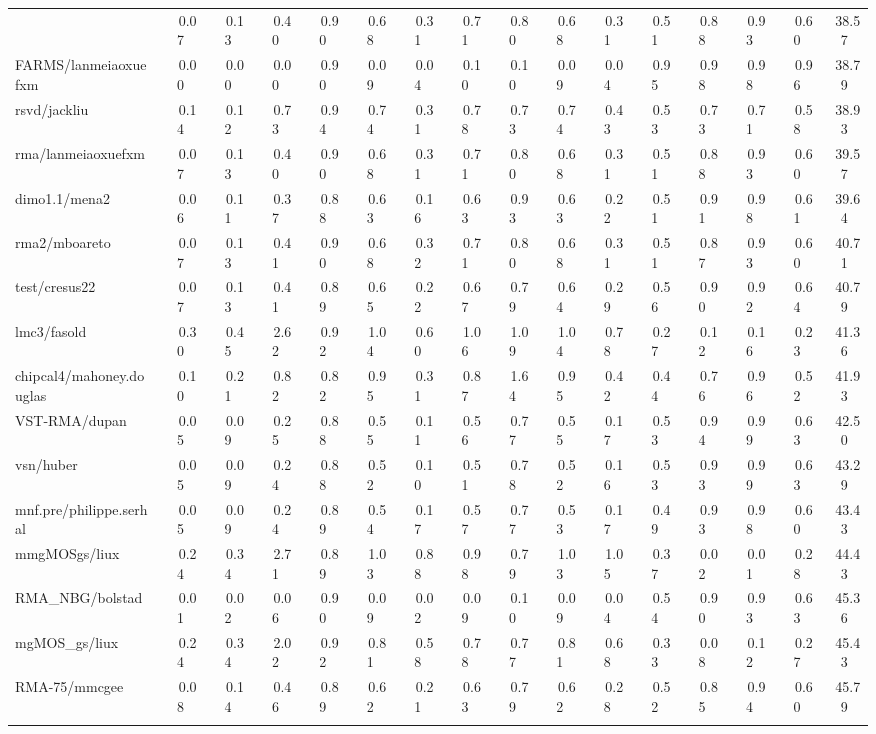 \begin{table}[hptb]
\begin{center}
\begin{tabular}{|l||c|c|c|c|c|c|c|c|c|c|c|c|c|c|c|}
{RMA/lanmeiaoxuefxm&~~0.07&~~0.13&~~0.40&~~0.90&~~0.68&~~0.31&~~0.71&~~0.80&~~0.68&~~0.31&~~0.51&~~0.88&~~0.93&~~0.60&~38.57\\ 
FARMS/lanmeiaoxuefxm&~~0.00&~~0.00&~~0.00&~~0.90&~~0.09&~~0.04&~~0.10&~~0.10&~~0.09&~~0.04&~~0.95&~~0.98&~~0.98&~~0.96&~38.79\\ 
rsvd/jackliu&~~0.14&~~0.12&~~0.73&~~0.94&~~0.74&~~0.31&~~0.78&~~0.73&~~0.74&~~0.43&~~0.53&~~0.73&~~0.71&~~0.58&~38.93\\ 
rma/lanmeiaoxuefxm&~~0.07&~~0.13&~~0.40&~~0.90&~~0.68&~~0.31&~~0.71&~~0.80&~~0.68&~~0.31&~~0.51&~~0.88&~~0.93&~~0.60&~39.57\\ 
dimo1.1/mena2&~~0.06&~~0.11&~~0.37&~~0.88&~~0.63&~~0.16&~~0.63&~~0.93&~~0.63&~~0.22&~~0.51&~~0.91&~~0.98&~~0.61&~39.64\\ 
rma2/mboareto&~~0.07&~~0.13&~~0.41&~~0.90&~~0.68&~~0.32&~~0.71&~~0.80&~~0.68&~~0.31&~~0.51&~~0.87&~~0.93&~~0.60&~40.71\\ 
test/cresus22&~~0.07&~~0.13&~~0.41&~~0.89&~~0.65&~~0.22&~~0.67&~~0.79&~~0.64&~~0.29&~~0.56&~~0.90&~~0.92&~~0.64&~40.79\\ 
lmc3/fasold&~~0.30&~~0.45&~~2.62&~~0.92&~~1.04&~~0.60&~~1.06&~~1.09&~~1.04&~~0.78&~~0.27&~~0.12&~~0.16&~~0.23&~41.36\\ 
chipcal4/mahoney.douglas&~~0.10&~~0.21&~~0.82&~~0.82&~~0.95&~~0.31&~~0.87&~~1.64&~~0.95&~~0.42&~~0.44&~~0.76&~~0.96&~~0.52&~41.93\\ 
VST-RMA/dupan&~~0.05&~~0.09&~~0.25&~~0.88&~~0.55&~~0.11&~~0.56&~~0.77&~~0.55&~~0.17&~~0.53&~~0.94&~~0.99&~~0.63&~42.50\\ 
vsn/huber&~~0.05&~~0.09&~~0.24&~~0.88&~~0.52&~~0.10&~~0.51&~~0.78&~~0.52&~~0.16&~~0.53&~~0.93&~~0.99&~~0.63&~43.29\\ 
mnf.pre/philippe.serhal&~~0.05&~~0.09&~~0.24&~~0.89&~~0.54&~~0.17&~~0.57&~~0.77&~~0.53&~~0.17&~~0.49&~~0.93&~~0.98&~~0.60&~43.43\\ 
mmgMOSgs/liux&~~0.24&~~0.34&~~2.71&~~0.89&~~1.03&~~0.88&~~0.98&~~0.79&~~1.03&~~1.05&~~0.37&~~0.02&~~0.01&~~0.28&~44.43\\ 
RMA_NBG/bolstad&~~0.01&~~0.02&~~0.06&~~0.90&~~0.09&~~0.02&~~0.09&~~0.10&~~0.09&~~0.04&~~0.54&~~0.90&~~0.93&~~0.63&~45.36\\ 
mgMOS_gs/liux&~~0.24&~~0.34&~~2.02&~~0.92&~~0.81&~~0.58&~~0.78&~~0.77&~~0.81&~~0.68&~~0.33&~~0.08&~~0.12&~~0.27&~45.43\\ 
RMA-75/mmcgee&~~0.08&~~0.14&~~0.46&~~0.89&~~0.62&~~0.21&~~0.63&~~0.79&~~0.62&~~0.28&~~0.52&~~0.85&~~0.94&~~0.60&~45.79\\ 
}
\end{tabular}
\end{center}
\end{table}

